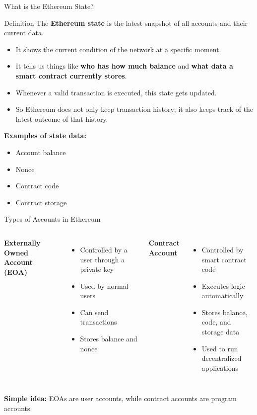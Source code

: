 \documentclass{beamer}
\begin{document}
\begin{frame}{What is the Ethereum State?}
\begin{block}{Definition}
The \textbf{Ethereum state} is the latest snapshot of all accounts and their current data.
\end{block}

\begin{itemize}
    \item It shows the current condition of the network at a specific moment.
    \item It tells us things like \textbf{who has how much balance} and \textbf{what data a smart contract currently stores}.
    \item Whenever a valid transaction is executed, this state gets updated.
    \item So Ethereum does not only keep transaction history; it also keeps track of the latest outcome of that history.
\end{itemize}

\vspace{0.2cm}
\textbf{Examples of state data:}
\begin{itemize}
    \item Account balance
    \item Nonce
    \item Contract code
    \item Contract storage
\end{itemize}
\end{frame}

\begin{frame}{Types of Accounts in Ethereum}
\begin{columns}[t]
\textbf{Externally Owned Account (EOA)}
\begin{itemize}
    \item Controlled by a user through a private key
    \item Used by normal users
    \item Can send transactions
    \item Stores balance and nonce
\end{itemize}

\textbf{Contract Account}
\begin{itemize}
    \item Controlled by smart contract code
    \item Executes logic automatically
    \item Stores balance, code, and storage data
    \item Used to run decentralized applications
\end{itemize}
\end{columns}

\vspace{0.3cm}
\textbf{Simple idea:} EOAs are user accounts, while contract accounts are program accounts.
\end{frame}
\end{document}
